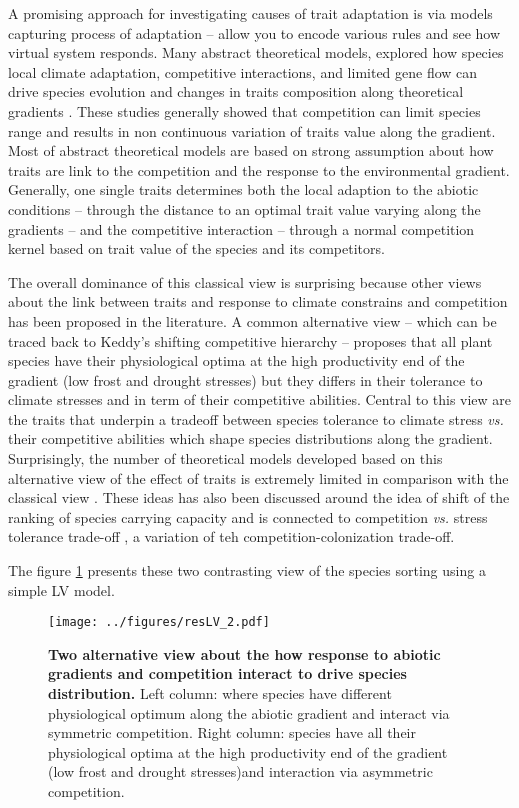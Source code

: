 \documentclass[a4paper,11pt]{article}
\begin{document}
A promising approach for investigating causes of trait adaptation is via models capturing process of adaptation -- allow you to encode various rules and see how virtual system responds. Many abstract theoretical models, explored how species local climate adaptation, competitive interactions, and limited gene flow can drive species evolution and changes in traits composition along theoretical gradients \citep{Case-2000,Doebeli-2003,Goldberg-2006,Leimar-2008}. These studies generally showed that competition can limit species range and results in non continuous variation of traits value along the gradient. Most of abstract theoretical models are based on strong assumption about how traits are link to the competition and the response to the environmental gradient. Generally, one single traits determines both the local adaption to the abiotic conditions -- through the distance to an optimal trait value varying along the gradients -- and the competitive interaction -- through a normal competition kernel based on trait value of the species and its competitors\citep[see][]{Case-2000}.

The overall dominance of this classical view is surprising because other views about the link between traits and response to climate constrains and competition has been proposed in the literature. A common alternative view -- which can be traced back to Keddy's shifting competitive hierarchy \citep{Keddy-1989}-- proposes that all plant species have their physiological optima at the high productivity end of the gradient (low frost and drought stresses) but they differs in their tolerance to climate stresses and in term of their competitive abilities\citep{Keddy-1989}. Central to this view are the traits that underpin a tradeoff between species tolerance to climate stress \textit{vs.} their competitive abilities which shape species distributions along the gradient. Surprisingly, the number of theoretical models developed based on this alternative view of the effect of traits is extremely limited in comparison with the classical view \citep{Smith-1989,Lienard-2016}. These ideas has also been discussed around the idea of shift of the ranking of species carrying capacity \citep{Case-2005} and is connected to competition \textit{vs.} stress tolerance trade-off \citep{Muller-Landau-2010}, a variation of teh competition-colonization trade-off.

The figure \ref{fig:theointro} presents these two contrasting view of the species sorting using a simple LV model.

\begin{figure}[ht]
\centering
\texttt{[image: ../figures/resLV\_2.pdf]}
\caption{\textbf{Two alternative view about the how response to abiotic gradients and competition interact to drive species distribution.} Left column: where species have different physiological optimum along the abiotic gradient and interact via symmetric competition. Right column:  species have all their physiological optima at the high productivity end of the gradient (low frost and drought stresses)and interaction via asymmetric competition.
\label{fig:theointro}}
\end{figure}
\end{document}
